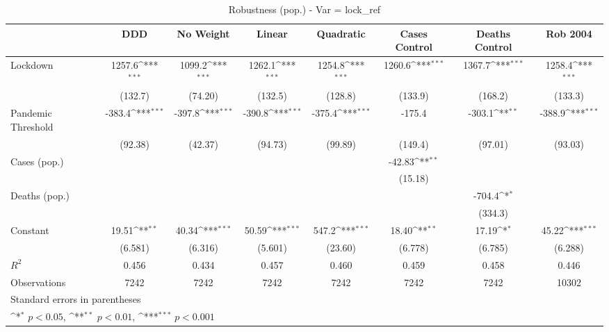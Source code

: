 \documentclass{article}
\begin{document}
{
\def\sym#1{\ifmmode^{#1}\else\(^{#1}\)\fi}
\begin{longtable}{l*{7}{c}}
\caption{Robustness (pop.) - Var = lock\_ref}\\
\hline\hline\endfirsthead\hline\endhead\hline\endfoot\endlastfoot
                &\multicolumn{1}{c}{DDD}&\multicolumn{1}{c}{No Weight}&\multicolumn{1}{c}{Linear}&\multicolumn{1}{c}{Quadratic}&\multicolumn{1}{c}{Cases Control}&\multicolumn{1}{c}{Deaths Control}&\multicolumn{1}{c}{Rob 2004}\\
\hline
Lockdown        &   1257.6\sym{***}&   1099.2\sym{***}&   1262.1\sym{***}&   1254.8\sym{***}&   1260.6\sym{***}&   1367.7\sym{***}&   1258.4\sym{***}\\
                &  (132.7)         &  (74.20)         &  (132.5)         &  (128.8)         &  (133.9)         &  (168.2)         &  (133.3)         \\
Pandemic Threshold&   -383.4\sym{***}&   -397.8\sym{***}&   -390.8\sym{***}&   -375.4\sym{***}&   -175.4         &   -303.1\sym{**} &   -388.9\sym{***}\\
                &  (92.38)         &  (42.37)         &  (94.73)         &  (99.89)         &  (149.4)         &  (97.01)         &  (93.03)         \\
Cases (pop.)    &                  &                  &                  &                  &   -42.83\sym{**} &                  &                  \\
                &                  &                  &                  &                  &  (15.18)         &                  &                  \\
Deaths (pop.)   &                  &                  &                  &                  &                  &   -704.4\sym{*}  &                  \\
                &                  &                  &                  &                  &                  &  (334.3)         &                  \\
Constant        &    19.51\sym{**} &    40.34\sym{***}&    50.59\sym{***}&    547.2\sym{***}&    18.40\sym{**} &    17.19\sym{*}  &    45.22\sym{***}\\
                &  (6.581)         &  (6.316)         &  (5.601)         &  (23.60)         &  (6.778)         &  (6.785)         &  (6.288)         \\
\hline
\(R^{2}\)       &    0.456         &    0.434         &    0.457         &    0.460         &    0.459         &    0.458         &    0.446         \\
Observations    &     7242         &     7242         &     7242         &     7242         &     7242         &     7242         &    10302         \\
\hline\hline
\multicolumn{8}{l}{\footnotesize Standard errors in parentheses}\\
\multicolumn{8}{l}{\footnotesize \sym{*} \(p<0.05\), \sym{**} \(p<0.01\), \sym{***} \(p<0.001\)}\\
\end{longtable}
}
\end{document}
